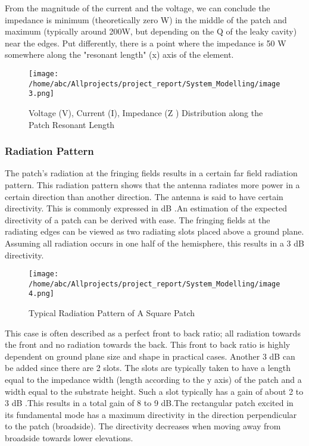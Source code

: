 	 \justify
      From the magnitude of the current and the voltage, we can conclude the impedance is minimum (theoretically zero W) in the middle of the patch and maximum (typically around 200W, but depending on the Q of the leaky cavity) near the edges. Put differently, there is a point where the impedance is 50 W somewhere along the "resonant length" (x) axis of the element.

        \begin{figure}[H]
         	\centering
           	\texttt{[image: /home/abc/Allprojects/project\_report/System\_Modelling/image3.png]}
           	\caption{Voltage (V), Current (I), Impedance (Z ) Distribution along the Patch Resonant Length}
         \end{figure}



      \subsubsection{Radiation Pattern}
       \justify
        The patch's radiation at the fringing fields results in a certain far field radiation pattern. This radiation pattern shows that the antenna radiates more power in a certain direction than another direction. The antenna is said to have certain directivity. This is commonly expressed in dB .An estimation of the expected directivity of a patch can be derived with ease. The fringing fields at the radiating edges can be viewed as two radiating slots placed above a ground plane. Assuming all radiation occurs in one half of the hemisphere, this results in a 3 dB directivity.
        \begin{figure}[H]
        	\centering
        	\texttt{[image: /home/abc/Allprojects/project\_report/System\_Modelling/image4.png]}
        	\caption{Typical Radiation Pattern of A Square Patch}
        \end{figure}

        This case is often described as a perfect front to back ratio; all radiation towards the front and no radiation towards the back. This front to back ratio is highly dependent on ground plane size and shape in practical cases. Another 3 dB can be added since there are 2 slots. The slots are typically taken to have a length equal to the impedance width (length according to the y axis) of the patch and a width equal to the substrate height. Such a slot typically has a gain of about 2 to 3 dB .This results in a total gain of 8 to 9 dB.The rectangular patch excited in its fundamental mode has a maximum directivity in the direction perpendicular to the patch (broadside). The directivity decreases when moving away from broadside towards lower elevations.
        
